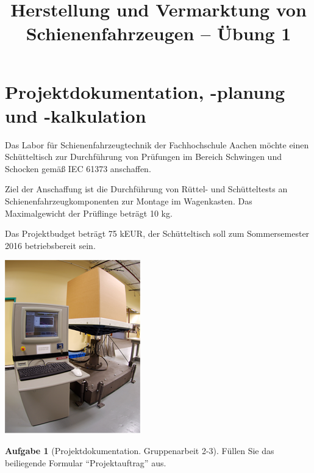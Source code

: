 \documentclass[10pt,a4paper,headsepline,smallheadings]{scrartcl}
\title{Herstellung und Vermarktung von Schienenfahrzeugen  -- \"Ubung 1}
\date{}
\theoremstyle{definition}
\newtheorem{aufgabe}{Aufgabe}
\begin{document}
\thispagestyle{empty}
\maketitle
\vspace{-2cm}

\section*{Projektdokumentation, -planung und -kalkulation}
\begin{minipage}[b]{0.7\textwidth}
Das Labor f\"ur Schienenfahrzeugtechnik der Fachhochschule Aachen m\"ochte einen Sch\"utteltisch zur Durchf\"uhrung von Pr\"ufungen im Bereich Schwingen und Schocken gem\"a{\ss} IEC 61373 anschaffen.

Ziel der Anschaffung ist die Durchf\"uhrung von R\"uttel- und Sch\"utteltests an Schienenfahrzeugkomponenten zur Montage im Wagenkasten. Das Maximalgewicht der Pr\"uflinge betr\"agt 10 kg.

Das Projektbudget betr\"agt 75 kEUR, der Sch\"utteltisch soll zum Sommersemester 2016 betriebsbereit sein.
\end{minipage}
\begin{minipage}[b]{0.3\textwidth}
\begin{center}
\includegraphics[width=.6\linewidth]{Tester}
\end{center}
\end{minipage}
\vspace{.5cm}

\begin{aufgabe}[Projektdokumentation. Gruppenarbeit 2-3] 
F\"ullen Sie das beiliegende Formular ``Projektauftrag'' aus.
\end{aufgabe}
\end{document}
